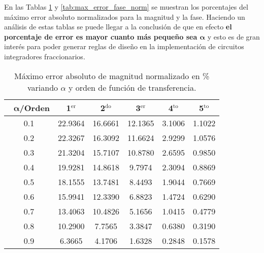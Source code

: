 	En las Tablas \ref{tab:max_error_mag_norm} y \ref{tab:max_error_fase_norm} se muestran los porcentajes del máximo error absoluto normalizados para la magnitud y la fase. Haciendo un análisis de estas tablas se puede llegar a la conclusión de que en efecto \textbf{el porcentaje de error es mayor cuanto más pequeño sea $\bm{\alpha}$} y esto es de gran interés para poder generar reglas de diseño en la implementación de circuitos integradores fraccionarios.

	\begin{table}[!hbp]                                 
	\centering            
	\caption{Máximo error absoluto de magnitud normalizado en \% variando $\alpha$ y orden de función de transferencia.}                           
	\label{tab:max_error_mag_norm}                               
		\begin{tabular}{cccccc}
			\hline                                             
			$\,\,\,\,\bm{\alpha}$\textbf{/Orden} & \textbf{1$^{\mathrm{er}}$} & \textbf{2$^{\mathrm{do}}$} & \textbf{3$^{\mathrm{er}}$} & \textbf{4$^{\mathrm{to}}$} & \textbf{5$^{\mathrm{to}}$} \\                     
			\hline                                             
			0.1 & 22.9364 & 16.6661 & 12.1365 & 3.1006 & 1.1022 \\
			                                               
			0.2 & 22.3267 & 16.3092 & 11.6624 & 2.9299 & 1.0576 \\
			                                                
			0.3 & 21.3204 & 15.7107 & 10.8780 & 2.6595 & 0.9850 \\
			                                               
			0.4 & 19.9281 & 14.8618 & 9.7974 & 2.3094 & 0.8869 \\ 
			                                               
			0.5 & 18.1555 & 13.7481 & 8.4493 & 1.9044 & 0.7669 \\ 
			                                                
			0.6 & 15.9941 & 12.3390 & 6.8823 & 1.4724 & 0.6290 \\ 
			                                              
			0.7 & 13.4063 & 10.4826 & 5.1656 & 1.0415 & 0.4779 \\ 
			                                              
			0.8 & 10.2900 & 7.7565 & 3.3847 & 0.6380 & 0.3190 \\  
			                                             
			0.9 & 6.3665 & 4.1706 & 1.6328 & 0.2848 & 0.1578 \\  
			\hline                                             
		\end{tabular}                                                             
	\end{table}


